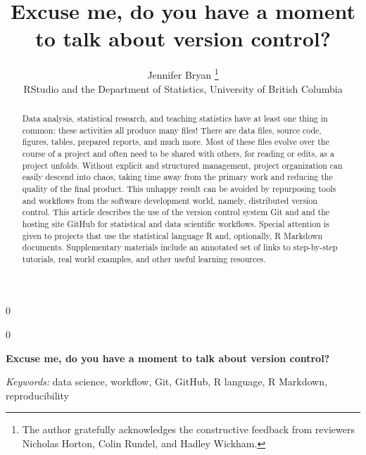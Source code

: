 \documentclass[12pt]{article}
\newcommand{\blind}{0}
\begin{document}
\def\spacingset#1{\renewcommand{\baselinestretch}%
{#1}\small\normalsize} \spacingset{1}



\blind
{
  \title{\bf Excuse me, do you have a moment to talk about version control?}

  \author{
        Jennifer Bryan \thanks{The author gratefully acknowledges the constructive feedback from
reviewers Nicholas Horton, Colin Rundel, and Hadley Wickham.} \\
    RStudio and the Department of Statistics, University of British Columbia\\
      }
  \maketitle
} \fi

\blind
{
  \bigskip
  \bigskip
  \bigskip
  \begin{center}
    {\LARGE\bf Excuse me, do you have a moment to talk about version control?}
  \end{center}
  \medskip
} \fi

\bigskip
\begin{abstract}
Data analysis, statistical research, and teaching statistics have at
least one thing in common: these activities all produce many files!
There are data files, source code, figures, tables, prepared reports,
and much more. Most of these files evolve over the course of a project
and often need to be shared with others, for reading or edits, as a
project unfolds. Without explicit and structured management, project
organization can easily descend into chaos, taking time away from the
primary work and reducing the quality of the final product. This unhappy
result can be avoided by repurposing tools and workflows from the
software development world, namely, distributed version control. This
article describes the use of the version control system Git and and the
hosting site GitHub for statistical and data scientific workflows.
Special attention is given to projects that use the statistical language
R and, optionally, R Markdown documents. Supplementary materials include
an annotated set of links to step-by-step tutorials, real world
examples, and other useful learning resources.
\end{abstract}

\noindent%
{\it Keywords:} data science, workflow, Git, GitHub, R language, R Markdown,
reproducibility
\vfill
\end{document}
